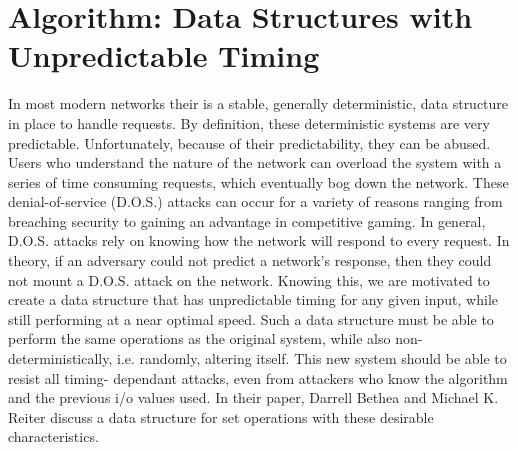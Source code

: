 \documentclass[11pt]{article}
\begin{document}
\section{Algorithm: Data Structures with Unpredictable Timing}
In most modern networks their is a stable, generally deterministic, data
structure in place to handle requests. By definition, these
deterministic systems are very predictable. Unfortunately, because of their
predictability, they can be abused. Users who understand the nature of 
the network can overload the system with a series of time consuming
requests, which eventually bog down the network. These denial-of-service
(D.O.S.) attacks can occur for a variety of reasons ranging from 
breaching security to gaining an advantage in competitive gaming. In 
general, D.O.S. attacks rely on knowing how the network will respond to 
every request. In theory, if an adversary could not predict a network's 
response, then they could not mount a D.O.S. attack on the network. 
Knowing this, we are motivated to 
create a data structure that has unpredictable timing 
for any given input, while still performing at a near optimal speed. 
Such a data structure must be able to perform the same operations as 
the original system, while also non-deterministically, i.e. randomly, 
altering itself. This new system should be able to resist all timing-
dependant attacks,
even from attackers who know the algorithm and the previous i/o values used.
In their paper, Darrell Bethea and Michael K. Reiter discuss a data
structure for set operations with these desirable characteristics\cite{Bethea09}.
\end{document}
